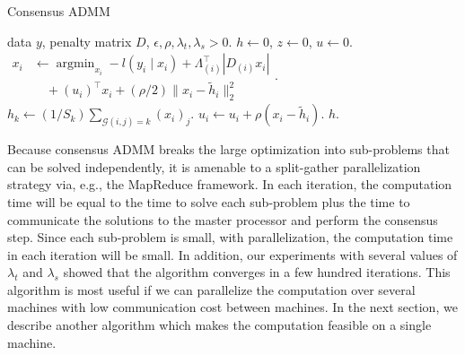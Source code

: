 \documentclass[letterpaper]{article} %
\DeclareMathOperator*{\argmin}{argmin}
\newcommand{\attn}[1]{\textcolor{red}{TODO: #1}}
\newcommand{\given}{\;\vert\;}
\newcommand{\norm}[1]{\left\lVert #1 \right\rVert}
\begin{document}
\begin{algorithm}[tb]
  \caption{Consensus ADMM }
  \label{alg:conADMM}
  \begin{algorithmic}[1]
     data $y$, penalty matrix $D$, 
    $\epsilon, \rho,\lambda_t,\lambda_s >0$.
     $h\leftarrow 0$, $z\leftarrow 0$, $u\leftarrow
    0$.  
    \REPEAT
    \STATE $\begin{aligned}x_i&\leftarrow\argmin_{x_i} -l(y_i\given
    x_i)+\Lambda_{(i)}^\top |D_{(i)}x_i|\\&\quad+ (u_i)^\top x_i +
    (\rho/2)  \lVert x_i-\tilde{h}_i \rVert_2^2\end{aligned}$. \\
    \STATE $h_k\leftarrow (1/S_k)\sum_{\mathscr{G}(i,j)=k} (x_i)_j
    $. 
    \STATE $ u_i\leftarrow u_i + \rho (x_i-\tilde{h}_i)$. 
    \UNTIL {$\max\left\{\norm{h^{m+1}-h^m},\ \norm{h^m-x^m}\right\} < \epsilon$}
     $h$.
  \end{algorithmic}
\end{algorithm}



Because consensus ADMM breaks the large optimization into
sub-problems that can be solved independently, it is amenable to a
split-gather parallelization strategy via, e.g., the MapReduce framework.
In each iteration, the
computation time will be equal to the time to solve each sub-problem
plus the time to communicate the solutions to the master processor
and perform the consensus step. Since each sub-problem is
small, with parallelization, the computation time in each iteration
will be small. In addition, our experiments with several values of
$\lambda_t$ and $\lambda_s$ showed that the algorithm converges in a few
hundred iterations. 
This algorithm is most useful if we can parallelize the
computation over several machines with low communication cost between
machines. In the next section, we describe 
another algorithm which makes the computation feasible on a single
machine. 
\end{document}
